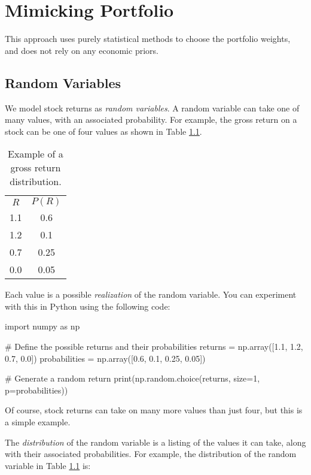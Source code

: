 \chapter{Mimicking Portfolio}

This approach uses purely statistical methods to choose the 
portfolio weights, and does not rely on any economic priors.

\section{Random Variables}

We model stock returns as \textit{random variables}.
A random variable can take one of many values, with an 
associated probability. For example, the gross return on 
a stock can be one of four values as shown in Table \ref{tab:randomvariable}.

\begin{table}[!htbp]
    \centering
    \begin{tabular}{c c}
        $R$ & $P(R)$ \\
        1.1 & 0.6 \\
        1.2 & 0.1 \\
        0.7 & 0.25 \\
        0.0 & 0.05 \\
    \end{tabular}
    \caption{Example of a gross return distribution.}
    \label{tab:randomvariable}
\end{table}

Each value is a possible \textit{realization}
of the random variable. You can experiment with this in Python
using the following code:

\begin{python}
import numpy as np

# Define the possible returns and their probabilities
returns = np.array([1.1, 1.2, 0.7, 0.0])
probabilities = np.array([0.6, 0.1, 0.25, 0.05])

# Generate a random return
print(np.random.choice(returns, size=1, p=probabilities))

\end{python}

Of course, stock returns can take on many more values 
than just four, but this is a simple example.

The \textit{distribution} of the random variable is 
a listing of the values it can take, along with their
associated probabilities. For example, the distribution
of the random variable in Table \ref{tab:randomvariable}
is:

